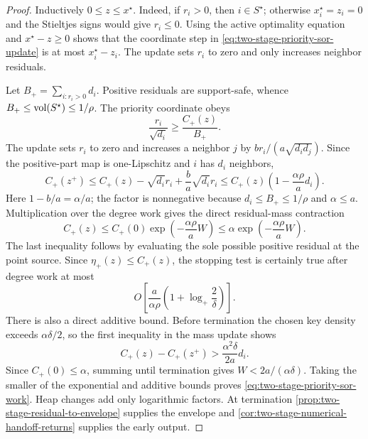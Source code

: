 \begin{proof}
Inductively $0\leq z\leq x^\star$.  Indeed, if $r_i>0$, then $i\in S^\star$;
otherwise $x_i^\star=z_i=0$ and the Stieltjes signs would give $r_i\leq0$.
Using the active optimality equation and $x^\star-z\geq0$ shows that the
coordinate step in \cref{eq:two-stage-priority-sor-update} is at most
$x_i^\star-z_i$.  The update sets $r_i$ to zero and only increases neighbor
residuals.

Let $B_+=\sum_{i:r_i>0}d_i$.  Positive residuals are support-safe, whence
$B_+\leq\operatorname{vol}(S^\star)\leq1/\rho$.  The priority coordinate obeys
\begin{equation*}
 \frac{r_i}{\sqrt{d_i}}\geq\frac{C_+(z)}{B_+}.
\end{equation*}
The update sets $r_i$ to zero and increases a neighbor $j$ by
$br_i/(a\sqrt{d_id_j})$.  Since the positive-part map is one-Lipschitz and
$i$ has $d_i$ neighbors,
\begin{equation*}
 C_+(z^+)
 \leq C_+(z)-\sqrt{d_i}r_i
       +\frac{b}{a}\sqrt{d_i}r_i
 \leq C_+(z)\left(1-\frac{\alpha\rho}{a}d_i\right).
\end{equation*}
Here $1-b/a=\alpha/a$; the factor is nonnegative because
$d_i\leq B_+\leq1/\rho$ and $\alpha\leq a$.  Multiplication over the degree work gives the direct
residual-mass contraction
\begin{equation*}
 C_+(z)\leq C_+(0)
 \exp\!\left(-\frac{\alpha\rho}{a}W\right)
 \leq\alpha\exp\!\left(-\frac{\alpha\rho}{a}W\right).
\end{equation*}
The last inequality follows by evaluating the sole possible positive residual
at the point source.  Since $\eta_+(z)\leq C_+(z)$, the stopping test is
certainly true after degree work at most
\begin{equation*}
 O\!\left[
  \frac{a}{\alpha\rho}
  \left(1+\log_+\frac{2}{\delta}\right)
 \right].
\end{equation*}
There is also a direct additive bound.  Before termination the chosen key
density exceeds $\alpha\delta/2$, so the first inequality in the mass update
shows
\begin{equation*}
 C_+(z)-C_+(z^+)>
 \frac{\alpha^2\delta}{2a}d_i.
\end{equation*}
Since $C_+(0)\leq\alpha$, summing until termination gives
$W<2a/(\alpha\delta)$.  Taking the smaller of the exponential and additive
bounds proves \cref{eq:two-stage-priority-sor-work}.
Heap changes add only logarithmic factors.  At termination
\cref{prop:two-stage-residual-to-envelope} supplies the envelope and
\cref{cor:two-stage-numerical-handoff-returns} supplies the early output.
\end{proof}

